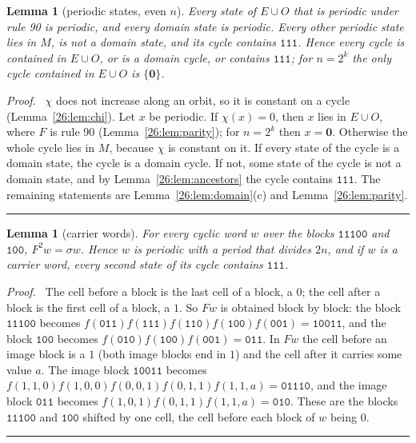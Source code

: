 \documentclass[10pt,a4paper]{article}
\newtheorem{lemma}[theorem]{Lemma}
\newcommand{\qedmark}{\rule{1.1ex}{1.1ex}}
\newenvironment{proof}[1][Proof]{\par\smallskip\noindent\textit{#1.}\ }{\hfill\qedmark\par\smallskip}
\newcommand{\zero}{\mathbf{0}}                %
\newcommand{\code}[1]{\mathtt{#1}}            %
\begin{document}
\begin{lemma}[periodic states, even $n$]\label{26:lem:kinds}
Every state of $E\cup O$ that is periodic under rule 90 is periodic, and every domain state is periodic. Every
other periodic state lies in $M$, is not a domain state, and its cycle contains $\code{111}$. Hence every cycle is
contained in $E\cup O$, or is a domain cycle, or contains $\code{111}$; for $n=2^k$ the only cycle contained in
$E\cup O$ is $\{\zero\}$.
\end{lemma}
\begin{proof}
$\chi$ does not increase along an orbit, so it is constant on a cycle (Lemma~\ref{26:lem:chi}). Let $x$ be periodic.
If $\chi(x)=0$, then $x$ lies in $E\cup O$, where $F$ is rule 90 (Lemma~\ref{26:lem:parity}); for $n=2^k$ then
$x=\zero$. Otherwise the whole cycle lies in $M$, because $\chi$ is constant on it. If every state of the cycle is a
domain state, the cycle is a domain cycle. If not, some state of the cycle is not a domain state, and by
Lemma~\ref{26:lem:ancestors} the cycle contains $\code{111}$. The remaining statements are
Lemma~\ref{26:lem:domain}(c) and Lemma~\ref{26:lem:parity}.
\end{proof}

\begin{lemma}[carrier words]\label{26:lem:carrier}
For every cyclic word $w$ over the blocks $\code{11100}$ and $\code{100}$, $F^2w=\sigma w$. Hence $w$ is periodic
with a period that divides $2n$, and if $w$ is a carrier word, every second state of its cycle contains
$\code{111}$.
\end{lemma}
\begin{proof}
The cell before a block is the last cell of a block, a $0$; the cell after a block is the first cell of a block, a
$1$. So $Fw$ is obtained block by block: the block $\code{11100}$ becomes
$f(\code{011})f(\code{111})f(\code{110})f(\code{100})f(\code{001})=\code{10011}$, and the block $\code{100}$ becomes
$f(\code{010})f(\code{100})f(\code{001})=\code{011}$. In $Fw$ the cell before an image block is a $1$ (both image
blocks end in $1$) and the cell after it carries some value $a$. The image block $\code{10011}$ becomes
$f(1,1,0)f(1,0,0)f(0,0,1)f(0,1,1)f(1,1,a)=\code{01110}$, and the image block $\code{011}$ becomes
$f(1,0,1)f(0,1,1)f(1,1,a)=\code{010}$. These are the blocks $\code{11100}$ and $\code{100}$ shifted by one cell,
the cell before each block of $w$ being $0$.
\end{proof}
\end{document}
